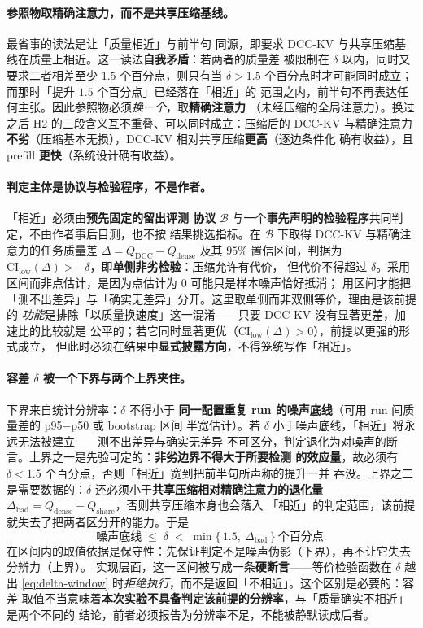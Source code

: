 \paragraph{参照物取精确注意力，而不是共享压缩基线。}最省事的读法是让「质量相近」与前半句
同源，即要求 DCC-KV 与共享压缩基线在质量上相近。这一读法\textbf{自我矛盾}：若两者的质量差
被限制在 $\delta$ 以内，同时又要求二者相差至少 $1.5$ 个百分点，则只有当
$\delta > 1.5$ 个百分点时才可能同时成立；而那时「提升 $1.5$ 个百分点」已经落在「相近」的
范围之内，前半句不再表达任何主张。因此参照物必须\emph{换一个}，取\textbf{精确注意力}
（未经压缩的全局注意力）。换过之后 H2 的三段含义互不重叠、可以同时成立：压缩后的 DCC-KV
与精确注意力\textbf{不劣}（压缩基本无损），DCC-KV 相对共享压缩\textbf{更高}（逐边条件化
确有收益），且 prefill \textbf{更快}（系统设计确有收益）。

\paragraph{判定主体是协议与检验程序，不是作者。}「相近」必须由\textbf{预先固定的留出评测
协议} $\mathcal{B}$ 与一个\textbf{事先声明的检验程序}共同判定，不由作者事后目测，也不按
结果挑选指标。在 $\mathcal{B}$ 下取得 DCC-KV 与精确注意力的任务质量差
$\Delta = Q_{\text{DCC}} - Q_{\text{dense}}$ 及其 $95\%$ 置信区间，判据为
$\mathrm{CI}_{\text{low}}(\Delta) > -\delta$，即\textbf{单侧非劣检验}：压缩允许有代价，
但代价不得超过 $\delta$。采用区间而非点估计，是因为点估计为 $0$ 可能只是样本噪声恰好抵消；
用区间才能把「测不出差异」与「确实无差异」分开。这里取单侧而非双侧等价，理由是该前提的
\emph{功能}是排除「以质量换速度」这一混淆——只要 DCC-KV 没有显著更差，加速比的比较就是
公平的；若它同时显著更优（$\mathrm{CI}_{\text{low}}(\Delta) > 0$），前提以更强的形式成立，
但此时必须在结果中\textbf{显式披露方向}，不得笼统写作「相近」。

\paragraph{容差 $\delta$ 被一个下界与两个上界夹住。}下界来自统计分辨率：$\delta$ 不得小于
\textbf{同一配置重复 run 的噪声底线}（可用 run 间质量差的 p95$-$p50 或 bootstrap 区间
半宽估计）。若 $\delta$ 小于噪声底线，「相近」将永远无法被建立——测不出差异与确实无差异
不可区分，判定退化为对噪声的断言。上界之一是先验可定的：\textbf{非劣边界不得大于所要检测
的效应量}，故必须有 $\delta < 1.5$ 个百分点，否则「相近」宽到把前半句所声称的提升一并
吞没。上界之二是需要数据的：$\delta$ 还必须小于\textbf{共享压缩相对精确注意力的退化量}
$\Delta_{\text{bad}} = Q_{\text{dense}} - Q_{\text{share}}$，否则共享压缩本身也会落入
「相近」的判定范围，该前提就失去了把两者区分开的能力。于是
\begin{equation}
\label{eq:delta-window}
\text{噪声底线} \;\le\; \delta \;<\; \min\{\,1.5,\ \Delta_{\text{bad}}\,\}\ \text{个百分点}.
\end{equation}
在区间内的取值依据是保守性：先保证判定不是噪声伪影（下界），再不让它失去分辨力（上界）。
实现层面，这一区间被写成一条\textbf{硬断言}——等价检验函数在 $\delta$ 越出
\eqref{eq:delta-window} 时\emph{拒绝执行}，而不是返回「不相近」。这个区别是必要的：容差
取值不当意味着\textbf{本次实验不具备判定该前提的分辨率}，与「质量确实不相近」是两个不同的
结论，前者必须报告为分辨率不足，不能被静默读成后者。

